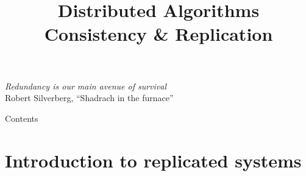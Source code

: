 \title[DS - Replication]{\textbf{Distributed Algorithms}\\Consistency \& Replication}



\newcommand{\REQ}{\textsc{req}}
\newcommand{\REP}{\textsc{rep}}
\newcommand{\NEWP}{\textsc{newp}}
\newcommand{\STATE}{\textsc{state}}
\newcommand{\ACK}{\textsc{state}}
\newcommand{\State}{\mathit{state}}
\newcommand{\Responses}{\mathit{response}}
\newcommand{\Id}{\mathit{id}}
\newcommand{\Servers}{\mathit{servers}}
\newcommand{\Update}{\mathsf{update}}
\newcommand{\Reply}{\mathsf{reply}}
\newcommand{\NewId}{\mathsf{newId}}
\newcommand{\Operation}{\mathsf{operation}}
\newcommand{\isPrimary}{\mathit{primary}}


\begin{frame}
\titlepage

\begin{flushright}
{\em Redundancy is our main avenue of survival} \\
Robert Silverberg, ``Shadrach in the furnace''
\end{flushright}


\invisible{{\tiny

 
}}


\end{frame}

\begin{frame}[shrink]{Contents}
\tableofcontents
\end{frame}

\section{Introduction to replicated systems}


